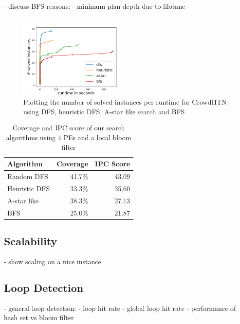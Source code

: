 - discuss BFS reasons:
	- minimum plan depth due to lilotane
	- 
\begin{figure}
	\caption{Plotting the number of solved instances per runtime for CrowdHTN using DFS, heuristic DFS, A-star like search and BFS}
	\label{figure: eval algorithm}
	\centering
	\includegraphics[width=0.5\textwidth]{images/final/search_algorithms.png}
\end{figure}
\begin{table}
	\caption{Coverage and IPC score of our search algorithms using 4 PEs and a local bloom filter}
	\label{table: eval algorithm}
	\centering
	\begin{tabular}{| l | r | r |}
		\hline
		Algorithm 		& Coverage & IPC Score \\
		\hline
		Random DFS 		& 41.7\%	& 43.09 \\ %
		Heuristic DFS 	& 33.3\%	& 35.60	\\ %
		A-star like 	& 38.3\%	& 27.13 \\ %
		BFS 			& 25.0\%	& 21.87	\\ %
		\hline
	\end{tabular}
\end{table}



\subsection{Scalability}
- show scaling on a nice instance

\subsection{Loop Detection}
- general loop detection:
- loop hit rate
- global loop hit rate
- performance of hash set vs bloom filter

